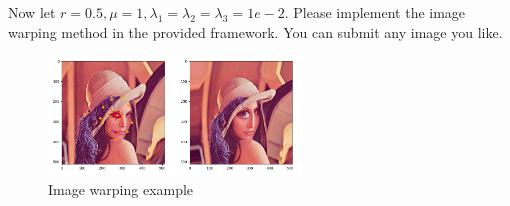 \documentclass[11pt,letter,notitlepage]{article}
\begin{document}
\begin{exercise}
\begin{enumerate}
    

    Now let $r=0.5, \mu=1, \lambda
    _1 = \lambda_2 = \lambda_3 = 1e-2$. Please implement the image warping method in the provided framework. You can submit any image you like.
\end{enumerate}
\end{exercise}
\begin{figure}[htbp]
    \centering
        \includegraphics[width=0.6\textwidth]{./Figure/HW2-example.png}
        \caption{Image warping example}
        \label{fig:image-warping}
\end{figure}
    
\end{document}
